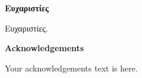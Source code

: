\clearpage
\thispagestyle{plain}
\vspace*{\fill}
\begin{center}
  \vspace{-4cm} %
  \textbf{Ευχαριστίες}
  
  \vspace{1.5em} %
  \parbox{0.75\textwidth}
  {%
    Ευχαριστίες.
  }
\end{center}
\vspace*{\fill}


\newpage

\clearpage
\thispagestyle{plain}

\vspace*{\fill}
\begin{center}
    \vspace{-4cm} %
    \textbf{Acknowledgements}
  
    \vspace{1.5em} %
    \parbox{0.75\textwidth}
    {%
        Your acknowledgements text is here.
    }
\end{center}
\vspace*{\fill}
